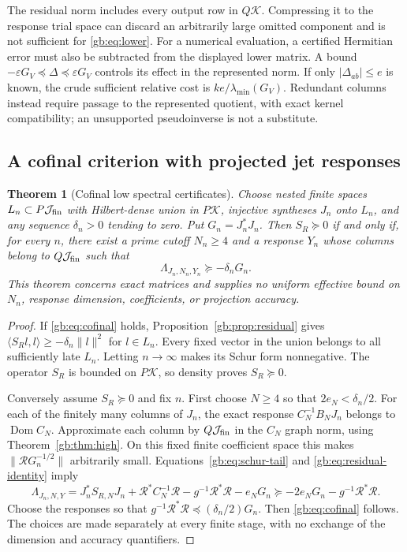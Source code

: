 \documentclass[11pt,a4paper]{article}
\numberwithin{equation}{section}
\newtheorem{theorem}{Theorem}[section]
\theoremstyle{definition}\newtheorem{definition}[theorem]{Definition}
\theoremstyle{remark}\newtheorem{remark}[theorem]{Remark}
\newcommand{\dom}{\operatorname{Dom}}\newcommand{\Var}{\operatorname{Var}}
\newcommand{\ip}[2]{\langle#1,#2\rangle}\newcommand{\norm}[1]{\lVert#1\rVert}\newcommand{\abs}[1]{\lvert#1\rvert}
\newcommand{\Kk}{\mathcal K}\newcommand{\Aa}{\mathcal A}\newcommand{\Ff}{\mathcal F}
\begin{document}
The residual norm includes every output row in $Q\Kk$. Compressing
it to the response trial space can discard an arbitrarily large omitted
component and is not sufficient for \eqref{gb:eq:lower}.
For a numerical evaluation, a certified Hermitian error must also be
subtracted from the displayed lower matrix. A bound
$-\varepsilon G_V\preceq\Delta\preceq\varepsilon G_V$ controls its
effect in the represented norm. If only $|\Delta_{ab}|\le e$ is known,
the crude sufficient relative cost is $ke/\lambda_{\min}(G_V)$.
Redundant columns instead require passage to the represented quotient,
with exact kernel compatibility; an unsupported pseudoinverse is not a
substitute.

\subsection{A cofinal criterion with projected jet responses}

\begin{theorem}[Cofinal low spectral certificates]
\label{gb:thm:cofinal}
Choose nested finite spaces $L_n\subset P\mathcal J_{\rm fin}$ with
Hilbert-dense union in $P\Kk$, injective syntheses $J_n$ onto $L_n$,
and any sequence $\delta_n>0$ tending to zero. Put $G_n=J_n^*J_n$.
Then $S_R\succeq0$ if and only if, for every $n$, there exist a prime
cutoff $N_n\ge4$ and a response $Y_n$ whose columns belong to
$Q\mathcal J_{\rm fin}$ such that
\begin{equation}\label{gb:eq:cofinal}
 \Lambda_{J_n,N_n,Y_n}\succeq-\delta_nG_n.
\end{equation}
This theorem concerns exact matrices and supplies no uniform effective
bound on $N_n$, response dimension, coefficients, or projection accuracy.
\end{theorem}
\begin{proof}
If \eqref{gb:eq:cofinal} holds, Proposition~\ref{gb:prop:residual}
gives $\ip{S_Rl}{l}\ge-\delta_n\norm l^2$ for $l\in L_n$.
Every fixed vector in the union belongs to all sufficiently late $L_n$.
Letting $n\to\infty$ makes its Schur form nonnegative. The operator
$S_R$ is bounded on $P\Kk$, so density proves $S_R\succeq0$.

Conversely assume $S_R\succeq0$ and fix $n$.
First choose $N\ge4$ so that $2e_N<\delta_n/2$.
For each of the finitely many columns of $J_n$, the exact response
$C_N^{-1}B_NJ_n$ belongs to $\dom C_N$. Approximate each column by
$Q\mathcal J_{\rm fin}$ in the $C_N$ graph norm, using
Theorem~\ref{gb:thm:high}. On this fixed finite coefficient space this
makes $\norm{\mathcal R G_n^{-1/2}}$ arbitrarily small.
Equations~\eqref{gb:eq:schur-tail} and
\eqref{gb:eq:residual-identity} imply
\[
 \Lambda_{J_n,N,Y}
 =J_n^*S_{R,N}J_n+\mathcal R^*C_N^{-1}\mathcal R
       -g^{-1}\mathcal R^*\mathcal R-e_NG_n
 \succeq-2e_NG_n-g^{-1}\mathcal R^*\mathcal R.
\]
Choose the responses so that
$g^{-1}\mathcal R^*\mathcal R\preceq(\delta_n/2)G_n$.
Then \eqref{gb:eq:cofinal} follows. The choices are made separately
at every finite stage, with no exchange of the dimension and accuracy
quantifiers.
\end{proof}
\end{document}
